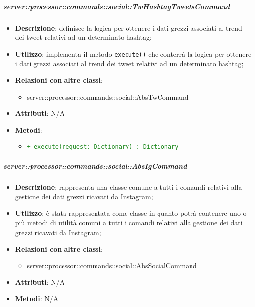         \subparagraph{server::processor::commands::social::TwHashtagTweetsCommand} %
        \label{subp:bdsm_app_server_processor_commands_social_twhashtagtweetscommand}
        \begin{itemize}
          \item \textbf{Descrizione}: definisce la logica per ottenere i dati grezzi associati al trend dei tweet relativi ad un determinato hashtag;
          \item \textbf{Utilizzo}: implementa il metodo \texttt{execute()} che conterrà la logica per ottenere i dati grezzi associati al trend dei tweet relativi ad un determinato hashtag;
          \item \textbf{Relazioni con altre classi}:
            \begin{itemize}
              \item server::processor::commands::social::AbsTwCommand
            \end{itemize}
          \item \textbf{Attributi}: N/A
          \item \textbf{Metodi}:
          \begin{itemize}
              \item \textcolor{forestgreen}{\texttt{+ execute(request: Dictionary) : Dictionary}}
          \end{itemize}
        \end{itemize}


        \subparagraph{server::processor::commands::social::AbsIgCommand} %
        \label{subp:bdsm_app_server_processor_commands_social_absigcommand}
        \begin{itemize}
          \item \textbf{Descrizione}: rappresenta una classe comune a tutti i comandi relativi alla gestione dei dati grezzi ricavati da Instagram;
          \item \textbf{Utilizzo}: è stata rappresentata come classe in quanto potrà contenere uno o più metodi di utilità comuni a tutti i comandi relativi alla gestione dei dati grezzi ricavati da Instagram;
          \item \textbf{Relazioni con altre classi}:
            \begin{itemize}
              \item server::processor::commands::social::AbsSocialCommand
            \end{itemize}
					\item \textbf{Attributi}: N/A
					\item \textbf{Metodi}: N/A
        \end{itemize}

